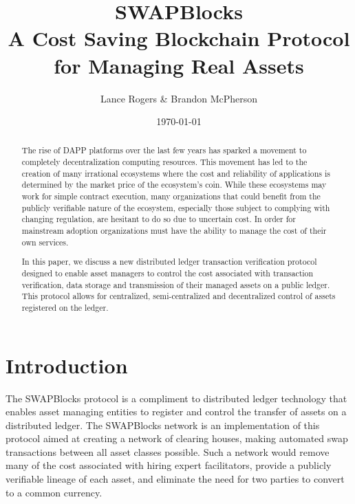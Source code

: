 \documentclass[12pt]{article}
\title{SWAPBlocks \\A Cost Saving Blockchain Protocol\\ for Managing Real Assets}
\author{Lance Rogers \& Brandon McPherson}
\date{\today}
\begin{document}
\maketitle

\begin{abstract}
	

	
	
The rise of DAPP platforms over the last few years has sparked a movement to 
completely decentralization computing resources.  This movement has led to 
the creation of many irrational ecosystems where the cost and reliability of
applications is determined by the market price of the ecosystem's coin. %
While these ecosystems may work for simple contract execution,
many organizations that could benefit from the publicly verifiable nature of the
ecosystem, especially those subject to complying with changing regulation,
	are hesitant to do so due to uncertain cost. 
In order for mainstream adoption organizations must have the ability to manage
the cost of their own services.

In this paper, we discuss a new distributed ledger transaction verification
protocol designed to enable asset managers to control the cost associated with
transaction verification, data storage and transmission of their managed assets on 
	a public ledger.
This protocol allows for centralized, semi-centralized 
and decentralized control of assets registered on the ledger. 


\end{abstract}

\pagebreak

\tableofcontents

\pagebreak

\section{Introduction}



The SWAPBlocks protocol is a compliment to distributed ledger technology that enables
asset managing entities to register and control the transfer of assets on a distributed
ledger.  The SWAPBlocks network is an implementation of this protocol aimed at creating a network
of clearing houses, making automated swap transactions between all asset classes possible.  Such a network
would remove many of the cost associated with hiring expert facilitators, provide a publicly verifiable
lineage of each asset, and eliminate the need for two parties to convert to a common currency.
\end{document}
